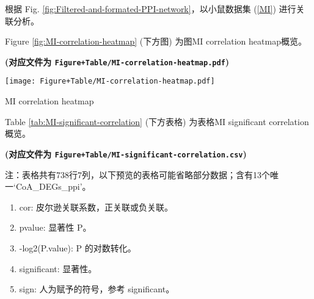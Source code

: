 \documentclass[
]{article}
\providecommand{\tightlist}{%
  \setlength{\itemsep}{0pt}\setlength{\parskip}{0pt}}
\begin{document}
根据 Fig. \ref{fig:Filtered-and-formated-PPI-network}，以小鼠数据集 (\ref{MI}) 进行关联分析。

Figure \ref{fig:MI-correlation-heatmap} (下方图) 为图MI correlation heatmap概览。

\textbf{(对应文件为 \texttt{Figure+Table/MI-correlation-heatmap.pdf})}

\def\@captype{figure}
\begin{center}
\texttt{[image: Figure+Table/MI-correlation-heatmap.pdf]}
\caption{MI correlation heatmap}\label{fig:MI-correlation-heatmap}
\end{center}

Table \ref{tab:MI-significant-correlation} (下方表格) 为表格MI significant correlation概览。

\textbf{(对应文件为 \texttt{Figure+Table/MI-significant-correlation.csv})}

\begin{center}\begin{tcolorbox}[colback=gray!10, colframe=gray!50, width=0.9\linewidth, arc=1mm, boxrule=0.5pt]注：表格共有738行7列，以下预览的表格可能省略部分数据；含有13个唯一`CoA\_DEGs\_ppi'。
\end{tcolorbox}
\end{center}
\begin{center}\begin{tcolorbox}[colback=gray!10, colframe=gray!50, width=0.9\linewidth, arc=1mm, boxrule=0.5pt]\begin{enumerate}\tightlist
\item cor:  皮尔逊关联系数，正关联或负关联。
\item pvalue:  显著性 P。
\item -log2(P.value):  P 的对数转化。
\item significant:  显著性。
\item sign:  人为赋予的符号，参考 significant。
\end{enumerate}\end{tcolorbox}
\end{center}
\end{document}
